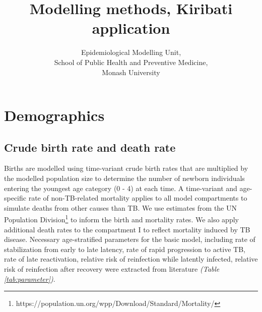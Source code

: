 \documentclass{article}
\author{
    Epidemiological Modelling Unit,
    \\ School of Public Health and Preventive Medicine,
    \\ Monash University
}
\title{Modelling methods, Kiribati application}
\begin{document}
\linespread{1.25}

\maketitle
\tableofcontents
\newpage


\section{Demographics}
\subsection{Crude birth rate and death rate}
Births are modelled using time-variant crude birth rates that are multiplied by the modelled population 
size to determine the number of newborn individuals entering the youngest age category (0 - 4) at each time. A time-variant 
and age-specific rate of non-TB-related mortality applies to all model compartments to simulate 
deaths from other causes than TB. We use estimates from the UN Population Division\footnote{https://population.un.org/wpp/Download/Standard/Mortality/} to inform the 
birth and mortality rates.
We also apply additional death rates to the compartment I to reflect mortality induced by TB 
disease.  Necessary age-stratified parameters for the basic model, including rate of stabilization from early to late latency,
rate of rapid progression to active TB, rate of late reactivation, relative risk of reinfection while latently infected, 
relative risk of reinfection after recovery were extracted from literature \emph{(Table \ref{tab:parameter})}.
\end{document}
